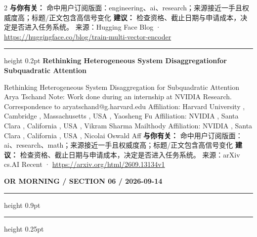 \documentclass[10.5pt]{ctexart}
\begin{document}
\begin{multicols}{2}
\textbf{与你有关：} 命中用户订阅版面：engineering、ai、research；来源接近一手且权威度高；标题/正文包含高信号变化
\textbf{建议：} 检查资格、截止日期与申请成本，决定是否进入任务系统。
{\footnotesize\color{ormuted} 来源：Hugging Face Blog · \url{https://huggingface.co/blog/train-multi-vector-encoder}}
\vspace{2mm}
\hrule height 0.2pt
\vspace{2mm}
{\large\bfseries Rethinking Heterogeneous System Disaggregationfor Subquadratic Attention}\par
Rethinking Heterogeneous System Disaggregation for Subquadratic Attention Arya Tschand Note: Work done during an internship at NVIDIA Research. Correspondence to aryatschand@g.harvard.edu Affiliation: Harvard University , Cambridge , Massachusetts , USA , Yaosheng Fu Affiliation: NVIDIA , Santa Clara , California , USA , Vikram Sharma Mailthody Affiliation: NVIDIA , Santa Clara , California , USA , Nicolai Oswald Aff
\textbf{与你有关：} 命中用户订阅版面：ai、research、math；来源接近一手且权威度高；标题/正文包含高信号变化
\textbf{建议：} 检查资格、截止日期与申请成本，决定是否进入任务系统。
{\footnotesize\color{ormuted} 来源：arXiv cs.AI Recent · \url{https://arxiv.org/html/2609.13134v1}}
\end{multicols}
\newpage
{\small\bfseries OR MORNING / SECTION 06 / 2026-09-14}
\vspace{2mm}
\hrule height 0.9pt
\vspace{1.5mm}
\hrule height 0.25pt
\vspace{4mm}
\end{document}
